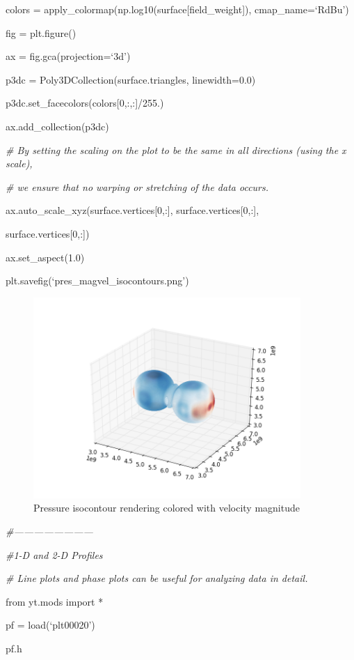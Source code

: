 colors = apply\_colormap(np.log10(surface[field\_weight]), cmap\_name=`RdBu')

fig = plt.figure()

ax = fig.gca(projection=`3d')

p3dc = Poly3DCollection(surface.triangles, linewidth=0.0)

p3dc.set\_facecolors(colors[0,:,:]/255.)

ax.add\_collection(p3dc)

{\it\# By setting the scaling on the plot to be the same in all directions (using the x scale),}
{\setlength{\parskip}{0pt}

{\it\# we ensure that no warping or stretching of the data occurs.}

ax.auto\_scale\_xyz(surface.vertices[0,:], surface.vertices[0,:],
}

{\setlength{\parindent}{87pt}surface.vertices[0,:])}

ax.set\_aspect(1.0)

plt.savefig(`pres\_magvel\_isocontours.png')
\begin{figure}[h]
\centering
\includegraphics[width=4in]{isocontours}
\caption{Pressure isocontour rendering colored with velocity magnitude}
\end{figure}

{\it\#------------------------}

{\it\#1-D and 2-D Profiles}
{\setlength{\parskip}{0pt}

{\it\# Line plots and phase plots can be useful for analyzing data in detail.}

from yt.mods import *
}

pf = load(`plt00020')

pf.h

